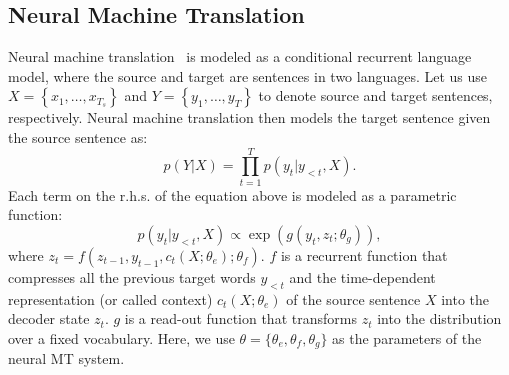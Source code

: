 \documentclass[11pt,letterpaper]{article}
\begin{document}
\subsection{Neural Machine Translation}
Neural machine translation~\cite{sutskever2014sequence,bahdanau2014neural} is modeled as a conditional recurrent language model, where the source and target are sentences in two languages. Let us use $X=\left\{ x_1, \ldots, x_{T_s} \right\}$ and $Y=\left\{ y_1, \ldots, y_T \right\}$ to denote source and target sentences, respectively. Neural machine translation then models the target sentence given the source sentence as:
\begin{equation}
p(Y|X) = \prod_{t=1}^T p(y_t | y_{<t}, X).
\end{equation}
Each term on the r.h.s. of the equation above is modeled as a parametric function:
\begin{equation}
p(y_t|y_{<t}, X)\propto \exp\left(g\left(y_t, z_t; \theta_g\right)\right),
\end{equation}
where 
$z_t = f(z_{t-1}, y_{t-1}, c_t(X; \theta_e); \theta_f)$.
$f$ is a recurrent function that compresses all the previous target words $y_{<t}$ and the time-dependent representation (or called context) $c_t(X; \theta_e)$ of the source sentence $X$ into the decoder state $z_t$. $g$ is a read-out function that transforms $z_t$ into the distribution over a fixed vocabulary.  Here, we use $\theta = \{\theta_e, \theta_f, \theta_g\}$ as the parameters of the neural MT system.
\end{document}
